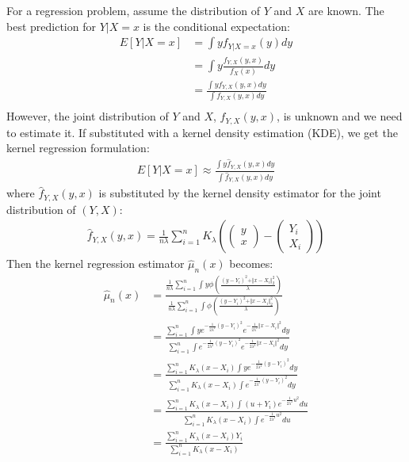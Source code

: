 \documentclass[a4paper]{article}
\begin{document}
For a regression problem, assume the distribution of $Y$ and $X$ are known. The best prediction for $Y|X=x$ is the conditional expectation:
\begin{align*}
    E[Y|X=x]&=\int yf_{Y|X=x}(y)dy\\
    &=\int y\frac{f_{Y,X}(y,x)}{f_X(x)}dy\\
    &=\frac{\int yf_{Y,X}(y,x)dy}{\int f_{Y,X}(y,x)dy}\\
\end{align*}
However, the joint distribution of $Y$ and $X$, $f_{Y,X}(y,x)$, is unknown and we need to estimate it. If substituted with a kernel density estimation (KDE), we get the kernel regression formulation:
\begin{align*}
    E[Y|X=x]\approx \frac{\int y\hat{f}_{Y,X}(y,x)dy}{\int \hat{f}_{Y,X}(y,x)dy}
\end{align*}
where $\hat{f}_{Y,X}(y,x)$ is substituted by the kernel density estimator for the joint distribution of $(Y, X)$:
\begin{align*}
\hat{f}_{Y,X}(y,x)=\frac{1}{n\lambda}\sum_{i=1}^nK_{\lambda}\left(
\begin{pmatrix}
y \\ x
\end{pmatrix}-
\begin{pmatrix}
Y_i \\ X_i
\end{pmatrix}\right)
\end{align*}
Then the kernel regression estimator $\hat{\mu}_n(x)$ becomes:
\begin{align*}
    \hat{\mu}_n(x)&=\frac{\frac{1}{n\lambda}\sum_{i=1}^n\int y\phi\left(\frac{(y-Y_i)^2+\Vert x-X_i\Vert_2^2}{\lambda}\right)}{\frac{1}{n\lambda}\sum_{i=1}^n\int \phi\left(\frac{(y-Y_i)^2+\Vert x-X_i\Vert_2^2}{\lambda}\right)} \\
    &=\frac{\sum_{i=1}^n\int ye^{-\frac{1}{2\lambda^2}(y-Y_i)^2}e^{-\frac{1}{2\lambda^2}\Vert x-X_i\Vert^2}dy}{\sum_{i=1}^n\int e^{-\frac{1}{2\lambda^2}(y-Y_i)^2}e^{-\frac{1}{2\lambda^2}\Vert x-X_i\Vert^2}dy}\\
    &=\frac{\sum_{i=1}^n K_{\lambda}(x-X_i)\int ye^{-\frac{1}{2\lambda^2}(y-Y_i)^2}dy}{\sum_{i=1}^nK_{\lambda}(x-X_i)\int e^{-\frac{1}{2\lambda^2}(y-Y_i)^2}dy}\\
    &=\frac{\sum_{i=1}^n K_{\lambda}(x-X_i)\int (u+Y_i)e^{-\frac{1}{2\lambda^2}u^2}du}{\sum_{i=1}^nK_{\lambda}(x-X_i)\int e^{-\frac{1}{2\lambda^2}u^2}du}\\
    &=\frac{\sum_{i=1}^n K_{\lambda}(x-X_i)Y_i}{\sum_{i=1}^nK_{\lambda}(x-X_i)}
\end{align*}
\end{document}
